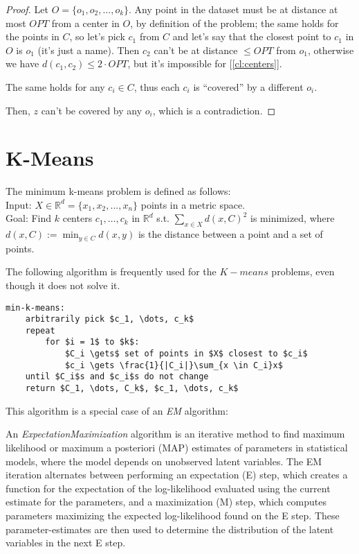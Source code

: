 \begin{proof}
    Let $O = \{o_1, o_2, \ldots, o_k\}$. Any point in the dataset must be at distance at most $OPT$ from a center in $O$, by definition of the problem; the same holds for the points in $C$, so let's pick $c_1$ from $C$ and let's say that the closest point to $c_1$ in $O$ is $o_1$ (it's just a name). Then $c_2$ can't be at distance $\leq OPT$ from $o_1$, otherwise we have $d(c_1, c_2) \leq 2 \cdot OPT$, but it's impossible for [\ref{cl:centers}].
    
    The same holds for any $c_i \in C$, thus each $c_i$ is ``covered'' by a different $o_i$.
    
    Then, $z$ can't be covered by any $o_i$, which is a contradiction.
\end{proof}

\section{K-Means}\label{sec:k-means}

\begin{defn}\label{defn:k-means}
    The minimum k-means problem is defined as follows:\\
    Input: $X \in \mathbb{R}^d = \{x_1, x_2, ..., x_n\}$ points in a metric space.\\
    Goal: Find $k$ centers $c_1, \dots, c_k$ in $\mathbb{R}^d$ s.t. $\sum_{x \in X} d(x,C)^2$ is minimized, where $d(x,C) := \min_{y \in C} d(x,y)$ is the distance between a point and a set of points.\\
\end{defn}

The following algorithm is frequently used for the $K-means$ problems, even though it does not solve it.
\begin{lstlisting}[caption={Lloyd's algorithm}, label={lst:lloyds}]
min-k-means:
    arbitrarily pick $c_1, \dots, c_k$
    repeat
        for $i = 1$ to $k$:
            $C_i \gets$ set of points in $X$ closest to $c_i$
            $c_i \gets \frac{1}{|C_i|}\sum_{x \in C_i}x$
    until $C_i$s and $c_i$s do not change
    return $C_1, \dots, C_k$, $c_1, \dots, c_k$
\end{lstlisting}

This algorithm is a special case of an \emph{EM} algorithm:
\begin{defn}
    An \emph{Expectation\-Maximization} algorithm is an iterative method to find maximum likelihood or maximum a posteriori (MAP) estimates of parameters in statistical models, where the model depends on unobserved latent variables. The EM iteration alternates between performing an expectation (E) step, which creates a function for the expectation of the log-likelihood evaluated using the current estimate for the parameters, and a maximization (M) step, which computes parameters maximizing the expected log-likelihood found on the E step. These parameter-estimates are then used to determine the distribution of the latent variables in the next E step.
\end{defn}

